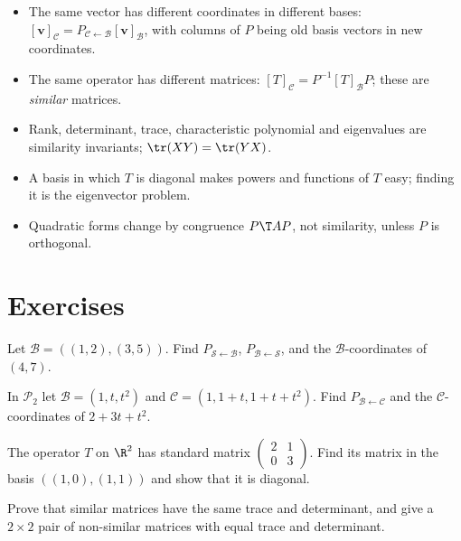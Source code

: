 \begin{summarybox}
\begin{itemize}
  \item The same vector has different coordinates in different bases: $[\mathbf{v}]_{\mathcal{C}}=P_{\mathcal{C}\leftarrow\mathcal{B}}[\mathbf{v}]_{\mathcal{B}}$, with columns of $P$ being old basis vectors in new coordinates.
  \item The same operator has different matrices: $[T]_{\mathcal{C}}=P^{-1}[T]_{\mathcal{B}}P$; these are \emph{similar} matrices.
  \item Rank, determinant, trace, characteristic polynomial and eigenvalues are similarity invariants; $\tr(XY)=\tr(YX)$.
  \item A basis in which $T$ is diagonal makes powers and functions of $T$ easy; finding it is the eigenvector problem.
  \item Quadratic forms change by congruence $P\T AP$, not similarity, unless $P$ is orthogonal.
\end{itemize}
\end{summarybox}

\section{Exercises}

\begin{exercise}
Let $\mathcal{B}=((1,2),(3,5))$. Find $P_{\mathcal{S}\leftarrow\mathcal{B}}$, $P_{\mathcal{B}\leftarrow\mathcal{S}}$, and the $\mathcal{B}$-coordinates of $(4,7)$.
\end{exercise}

\begin{exercise}
In $\mathcal{P}_2$ let $\mathcal{B}=(1,t,t^2)$ and $\mathcal{C}=(1,1+t,1+t+t^2)$. Find $P_{\mathcal{B}\leftarrow\mathcal{C}}$ and the $\mathcal{C}$-coordinates of $2+3t+t^2$.
\end{exercise}

\begin{exercise}
The operator $T$ on $\R^2$ has standard matrix $\begin{pmatrix}2&1\\0&3\end{pmatrix}$. Find its matrix in the basis $((1,0),(1,1))$ and show that it is diagonal.
\end{exercise}

\begin{exercise}
Prove that similar matrices have the same trace and determinant, and give a $2\times2$ pair of non-similar matrices with equal trace and determinant.
\end{exercise}

